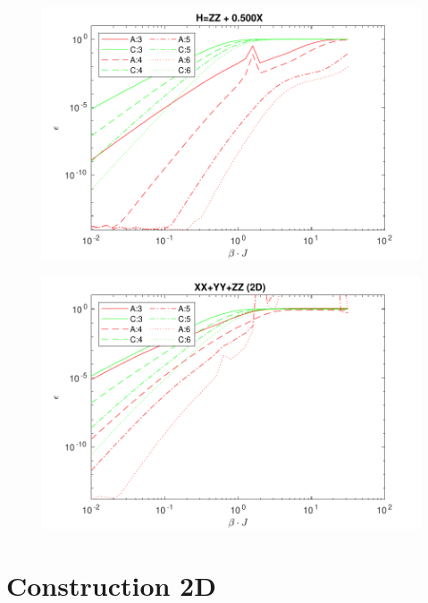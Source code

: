 \documentclass[aspectratio=169]{beamer}
\begin{document}
\begin{frame}
    \begin{figure}
        \includegraphics[scale=0.6]{Figures/1D_ising.pdf}
    \end{figure}
\end{frame}


\begin{frame}
    \begin{figure}
        \includegraphics[scale=0.6]{Figures/1D_heis.pdf}
    \end{figure}
\end{frame}

\section{Construction 2D}
\end{document}
